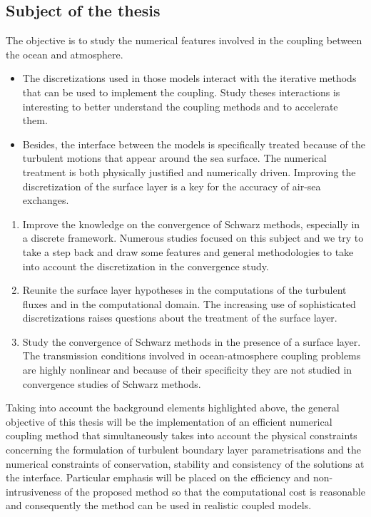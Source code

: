 \subsection*{Subject of the thesis}
The objective is to study the numerical features involved
in the coupling between the ocean and atmosphere.
\begin{itemize}
\item The discretizations used in those models interact with
the iterative methods that can be used to implement the coupling.
Study theses interactions is interesting to better understand
the coupling methods and to accelerate them.
\item Besides, the interface between the models is specifically
treated because of the turbulent motions that appear around the
sea surface.
The numerical treatment is both physically justified and
numerically driven. Improving the discretization of the surface
layer is a key for the accuracy of air-sea exchanges.
\end{itemize}
\begin{enumerate}
\item Improve the knowledge on the convergence of Schwarz methods,
especially in a discrete framework. Numerous studies focused on
this subject and we try to take a step back and draw some
features and general methodologies to take into account the
discretization in the convergence study.
\item Reunite the surface layer hypotheses in the computations
of the turbulent fluxes and in the computational domain.
The increasing use of sophisticated discretizations
raises questions about the treatment of the surface layer.
\item Study the convergence of Schwarz methods in the
presence of a surface layer. The transmission conditions
involved in ocean-atmosphere coupling problems are highly
nonlinear and because of their specificity
they are not studied in convergence studies of Schwarz methods.
\end{enumerate}


Taking into account the background elements highlighted above, the general objective of this thesis will be the implementation of an
efficient numerical coupling method that simultaneously takes into account the physical constraints concerning the formulation of turbulent
boundary layer parametrisations and the numerical constraints of conservation, stability and consistency of the solutions at the interface.
Particular emphasis will be placed on the efficiency and non-intrusiveness of the proposed method so that the computational cost is
reasonable and consequently the method can be used in realistic coupled models.

